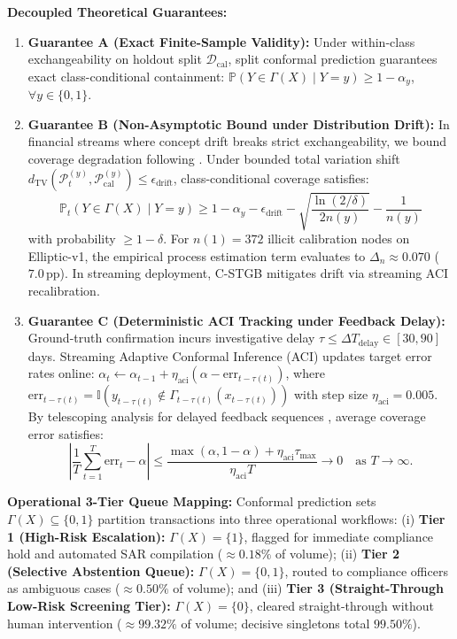 \textbf{Decoupled Theoretical Guarantees:}
\begin{enumerate}
    \item \textbf{Guarantee A (Exact Finite-Sample Validity):} Under within-class exchangeability on holdout split $\mathcal{D}_{\text{cal}}$, split conformal prediction guarantees exact class-conditional containment: $\mathbb{P}(Y \in \Gamma(X) \mid Y = y) \ge 1 - \alpha_y$, $\forall y \in \{0, 1\}$.
    \item \textbf{Guarantee B (Non-Asymptotic Bound under Distribution Drift):} In financial streams where concept drift breaks strict exchangeability, we bound coverage degradation following \citet{barber2023conformal}. Under bounded total variation shift $d_{\mathrm{TV}}(\mathcal{P}_t^{(y)}, \mathcal{P}_{\text{cal}}^{(y)}) \le \epsilon_{\text{drift}}$, class-conditional coverage satisfies:
    \begin{equation}
    \mathbb{P}_{t}(Y \in \Gamma(X) \mid Y=y) \ge 1 - \alpha_y - \epsilon_{\text{drift}} - \sqrt{\frac{\ln(2/\delta)}{2 n(y)}} - \frac{1}{n(y)}
    \end{equation}
    with probability $\ge 1 - \delta$. For $n(1) = 372$ illicit calibration nodes on Elliptic-v1, the empirical process estimation term evaluates to $\Delta_n \approx 0.070$ ($7.0\,\text{pp}$). In streaming deployment, C-STGB mitigates drift via streaming ACI recalibration.
    \item \textbf{Guarantee C (Deterministic ACI Tracking under Feedback Delay):} Ground-truth confirmation incurs investigative delay $\tau \le \Delta T_{\text{delay}} \in [30, 90]$\,days. Streaming Adaptive Conformal Inference (ACI) updates target error rates online: $\alpha_t \leftarrow \alpha_{t-1} + \eta_{\text{aci}} (\alpha - \text{err}_{t - \tau(t)})$, where $\text{err}_{t - \tau(t)} = \mathbb{I}(y_{t - \tau(t)} \notin \Gamma_{t - \tau(t)}(x_{t - \tau(t)}))$ with step size $\eta_{\text{aci}} = 0.005$. By telescoping analysis for delayed feedback sequences \citep{gibbs2021adaptive}, average coverage error satisfies:
    \begin{equation}
    \left| \frac{1}{T} \sum_{t=1}^T \text{err}_t - \alpha \right| \le \frac{\max(\alpha, 1-\alpha) + \eta_{\text{aci}} \tau_{\max}}{\eta_{\text{aci}} T} \to 0 \quad \text{as } T \to \infty.
    \end{equation}
\end{enumerate}

\textbf{Operational 3-Tier Queue Mapping:} Conformal prediction sets $\Gamma(X) \subseteq \{0, 1\}$ partition transactions into three operational workflows: (i) \textbf{Tier 1 (High-Risk Escalation):} $\Gamma(X) = \{1\}$, flagged for immediate compliance hold and automated SAR compilation ($\approx 0.18\%$ of volume); (ii) \textbf{Tier 2 (Selective Abstention Queue):} $\Gamma(X) = \{0, 1\}$, routed to compliance officers as ambiguous cases ($\approx 0.50\%$ of volume); and (iii) \textbf{Tier 3 (Straight-Through Low-Risk Screening Tier):} $\Gamma(X) = \{0\}$, cleared straight-through without human intervention ($\approx 99.32\%$ of volume; decisive singletons total $99.50\%$).

